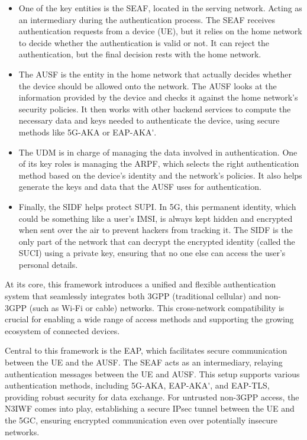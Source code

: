 \begin{itemize}
    \item{
        One of the key entities is the \ac{SEAF}, located in the serving network. Acting as an intermediary during the authentication process. The \ac{SEAF} receives authentication requests from a device (\ac{UE}), but it relies on the home network to decide whether the authentication is valid or not. It can reject the authentication, but the final decision rests with the home network.
    }
    \item{
        The \ac{AUSF} is the entity in the home network that actually decides whether the device should be allowed onto the network. The \ac{AUSF} looks at the information provided by the device and checks it against the home network's security policies. It then works with other backend services to compute the necessary data and keys needed to authenticate the device, using secure methods like \ac{5G-AKA} or \ac{EAP-AKA'}.
    }
    \item{
        The \ac{UDM} is in charge of managing the data involved in authentication. One of its key roles is managing the \ac{ARPF}, which selects the right authentication method based on the device's identity and the network's policies. It also helps generate the keys and data that the \ac{AUSF} uses for authentication.
    }
    \item{
        Finally, the \ac{SIDF} helps protect \ac{SUPI}. In \ac{5G}, this permanent identity, which could be something like a user’s \ac{IMSI}, is always kept hidden and encrypted when sent over the air to prevent hackers from tracking it. The \ac{SIDF} is the only part of the network that can decrypt the encrypted identity (called the \ac{SUCI}) using a private key, ensuring that no one else can access the user’s personal details.
    }
\end{itemize}

At its core, this framework introduces a unified and flexible authentication system that seamlessly integrates both \ac{3GPP} (traditional cellular) and non-\ac{3GPP} (such as Wi-Fi or cable) networks. This cross-network compatibility is crucial for enabling a wide range of access methods and supporting the growing ecosystem of connected devices.

Central to this framework is the \ac{EAP}, which facilitates secure communication between the \ac{UE} and the \ac{AUSF}. The \ac{SEAF} acts as an intermediary, relaying authentication messages between the \ac{UE} and \ac{AUSF}. This setup supports various authentication methods, including \ac{5G-AKA}, \ac{EAP-AKA'}, and \ac{EAP-TLS}, providing robust security for data exchange. For untrusted non-\ac{3GPP} access, the \ac{N3IWF} comes into play, establishing a secure \ac{IPsec} tunnel between the \ac{UE} and the \acl{5GC}, ensuring encrypted communication even over potentially insecure networks.%

